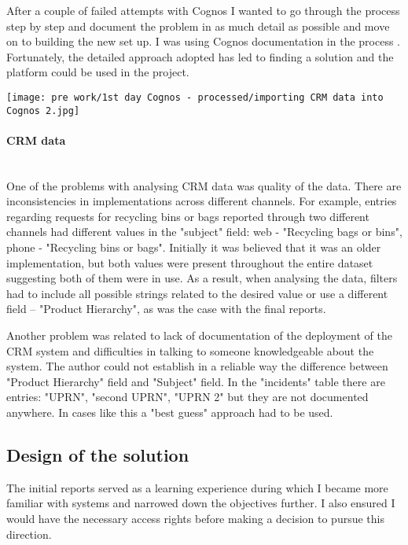 After a couple of failed attempts with Cognos I wanted to go through the process step by step and document the problem in as much detail as possible and move on to building the new set up. I was using Cognos documentation in the process \citep{IBM2015, IBM2015c}. Fortunately, the detailed approach adopted has led to finding a solution and the platform could be used in the project.

\begin{center}
  \texttt{[image: pre work/1st day Cognos - processed/importing CRM data into Cognos 2.jpg]}
  \label{normal_case}
\end{center}
	
				\paragraph{CRM data}\mbox{}\\
One of the problems with analysing CRM data was quality of the data. There are inconsistencies in implementations across different channels. For example, entries regarding requests for recycling bins or bags reported through two different channels had different values in the "subject" field: web - "Recycling bags or bins", phone - "Recycling bins or bags". Initially it was believed that it was an older implementation, but both values were present throughout the entire dataset suggesting both of them were in use. As a result, when analysing the data, filters had to include all possible strings related to the desired value or use a different field – "Product Hierarchy", as was the case with the final reports.

Another problem was related to lack of documentation of the deployment of the CRM system and difficulties in talking to someone knowledgeable about the system. The author could not establish in a reliable way the difference between "Product Hierarchy" field and "Subject" field. In the "incidents" table there are entries: "UPRN", "second UPRN", "UPRN 2" but they are not documented anywhere. In cases like this a "best guess" approach had to be used. 
				
		\subsection{Design of the solution}
		
The initial reports served as a learning experience during which I became more familiar with systems and narrowed down the objectives further. I also ensured I would have the necessary access rights before making a decision to pursue this direction.

